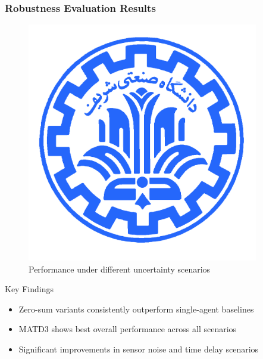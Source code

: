 \documentclass[
    11pt, %
    aspectratio=169, %
]{beamer}
\begin{document}
\begin{frame}
	\frametitle{Robustness Evaluation Results}
	
	\begin{figure}
		\centering
		\includegraphics[width=0.9\textwidth]{robustness_comparison_all.png}
		\caption{Performance under different uncertainty scenarios}
	\end{figure}
	
	\begin{block}{Key Findings}
		\begin{itemize}
			\item Zero-sum variants consistently outperform single-agent baselines
			\item MATD3 shows best overall performance across all scenarios
			\item Significant improvements in sensor noise and time delay scenarios
		\end{itemize}
	\end{block}
\end{frame}
\end{document}
